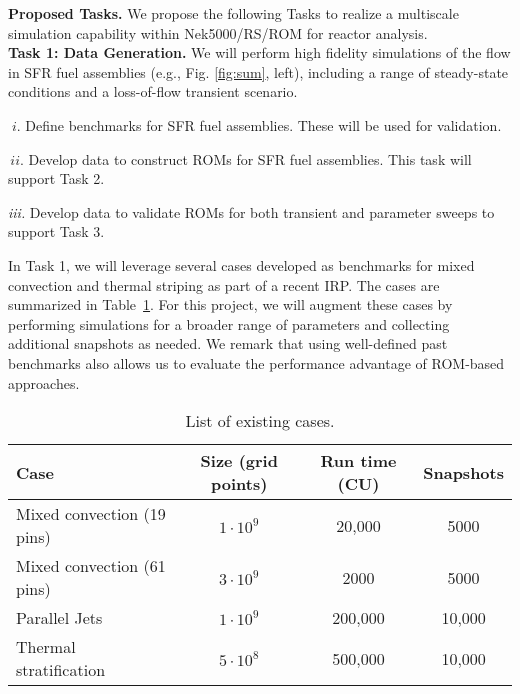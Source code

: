 \noindent
\textbf{Proposed Tasks.}
We propose the following Tasks to realize a multiscale simulation
capability within Nek5000/RS/ROM for reactor analysis.
\\[-1ex]

\noindent
\textbf{Task 1: Data Generation.} We will perform high fidelity simulations of
the flow in SFR fuel assemblies (e.g., Fig. \ref{fig:sum}, left), including
a range of steady-state conditions and a loss-of-flow transient scenario.
\\[-3ex]
\begin{description}
\item{$\; i.$}
Define benchmarks for SFR fuel assemblies. These will be used for validation.
\\[-4ex]
\item{$\, ii.$}
Develop data to construct ROMs for SFR fuel assemblies. This
task will support Task 2.
\\[-4ex]
\item{\em iii.} Develop data to validate ROMs for both
transient and parameter sweeps to support Task 3.
\\[-3ex]
\end{description}
In Task 1, we will leverage several cases developed as benchmarks for mixed
convection and thermal striping as part of a recent IRP. The cases are
summarized in Table~\ref{tab:cases}. For this project, we will augment these
cases by performing simulations for a broader range of parameters and
collecting additional snapshots as needed. We remark that using well-defined
past benchmarks also allows us to evaluate the performance advantage of
ROM-based approaches. \\[-2ex]

\begin{table}
\centering
\begin{tabular}{|l|c|c|c|}
\hline
\textbf{Case} & \textbf{Size} (grid points) & \textbf{Run time} (CU) & \textbf{Snapshots} \\\hline
Mixed convection (19 pins) \cite{kraus22}& $1\cdot 10^{9}$ & 20,000 & 5000 \\
\hline
Mixed convection (61 pins) \cite{kraus22}& $3\cdot 10^{9}$ & 2000 &  5000 \\
\hline
Parallel Jets \cite{acierno22}& $1\cdot 10^{9}$ & 200,000 & 10,000 \\
\hline
Thermal stratification \cite{krohn2018} & $5\cdot 10^{8}$ & 500,000 & 10,000 \\
\hline
\end{tabular}
\caption{\label{tab:cases} List of existing cases.}
\end{table}

